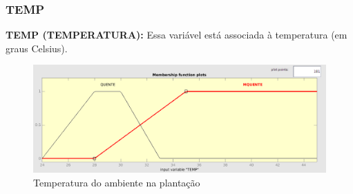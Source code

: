 \subsubsection{TEMP}

\textbf{TEMP (TEMPERATURA):} Essa variável está associada à temperatura (em graus Celsius).

\begin{figure}[h!]
\centering
\includegraphics[width=1\linewidth]{Descricao/Imagens/TEMP}
\caption{Temperatura do ambiente na plantação}
\label{fig:TEMP}
\end{figure}
